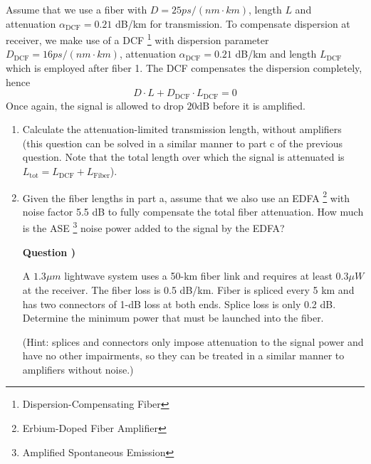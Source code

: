 \documentclass[10pt,letterpaper]{article}
\newcounter{QuestionNumber}
\newcommand{\Q}{
\textbf{Question \theQuestionNumber)}
\stepcounter{QuestionNumber}
}
\newcommand{\nl}{\newline\newline}
\begin{document}
Assume that we use a fiber with $D=25 ps/(nm\cdot km)$, length $L$ and  attenuation $\alpha_\text{DCF}=0.21$ dB/km for transmission. To compensate dispersion at receiver, we make use of a DCF
\footnote{
Dispersion-Compensating Fiber
}
 with dispersion parameter $D_\text{DCF}=16 ps/(nm\cdot km)$, attenuation $\alpha_\text{DCF}=0.21$ dB/km and length $L_\text{DCF}$ which is employed after fiber 1. The DCF compensates the dispersion completely, hence 
$$
D\cdot L+D_\text{DCF}\cdot L_\text{DCF}=0
$$
Once again, the signal is allowed to drop $20\text{dB}$ before it is amplified.
\begin{enumerate}[label=\alph*.]
\item
Calculate the attenuation-limited transmission length, without amplifiers (this question can be solved in a similar manner to part c of the previous question. Note that the total length over which the signal is attenuated is $L_\text{tot}=L_\text{DCF}+L_\text{Fiber}$).
\item
Given the fiber lengths in part a, assume that we also use an EDFA
\footnote{
Erbium-Doped Fiber Amplifier
}
with noise factor 5.5 dB to fully compensate the total fiber attenuation. How much is the ASE
\footnote{
Amplified Spontaneous Emission
}
 noise power added to the signal by the EDFA?
\nl
\Q

A $1.3 \mu m$ lightwave system uses a 50-km fiber link and requires at least $0.3 \mu W$
at the receiver. The fiber loss is 0.5 dB/km. Fiber is spliced every 5 km and has
two connectors of 1-dB loss at both ends. Splice loss is only 0.2 dB. Determine
the minimum power that must be launched into the fiber.

(Hint: splices and connectors only impose attenuation to the signal power and have no other impairments, so they can be treated in a similar manner to amplifiers without noise.)
\end{enumerate}
%
\end{document}
